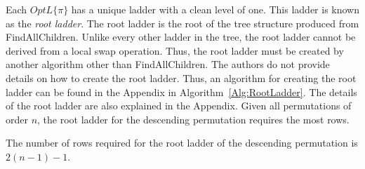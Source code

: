 Each $OptL\{\pi\}$ has a unique ladder with a clean level of one. This ladder 
is known as the \emph{root ladder}. The root ladder is the root of the tree structure 
produced from {\sc FindAllChildren}. Unlike every other ladder in the tree, 
the root ladder cannot be derived from a local swap operation. Thus, the root ladder 
must be created by another algorithm other than {\sc FindAllChildren}. 
The authors do not provide details on how to create the root ladder. Thus, an 
algorithm for creating the root ladder can be found in the Appendix in Algorithm~\ref{Alg:RootLadder}.
The details of the root ladder are also explained in the Appendix.
Given all permutations of order $n$, the root ladder for the descending permutation requires 
the most rows. 
\begin{theorem}
  The number of rows required for the root ladder of the descending permutation is $2(n-1) - 1$.
\end{theorem}
